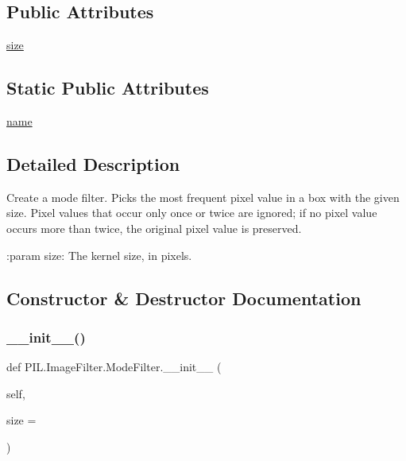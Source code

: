 \subsection*{Public Attributes}
\begin{DoxyCompactItemize}
\item 
\hyperlink{classPIL_1_1ImageFilter_1_1ModeFilter_a0464bb9aa5a0c5d3e17878ce56d687a1}{size}
\end{DoxyCompactItemize}
\subsection*{Static Public Attributes}
\begin{DoxyCompactItemize}
\item 
\hyperlink{classPIL_1_1ImageFilter_1_1ModeFilter_a1478a4e8ffde7c3cb2d5eb60dabb7633}{name}
\end{DoxyCompactItemize}


\subsection{Detailed Description}
\begin{DoxyVerb}Create a mode filter. Picks the most frequent pixel value in a box with the
given size.  Pixel values that occur only once or twice are ignored; if no
pixel value occurs more than twice, the original pixel value is preserved.

:param size: The kernel size, in pixels.
\end{DoxyVerb}
 

\subsection{Constructor \& Destructor Documentation}
\mbox{\label{classPIL_1_1ImageFilter_1_1ModeFilter_ac8790ad26d28c2e826f0cefa2b86bbb1}} 
\subsubsection{\texorpdfstring{\+\_\+\+\_\+init\+\_\+\+\_\+()}{\_\_init\_\_()}}
{\footnotesize\ttfamily def P\+I\+L.\+Image\+Filter.\+Mode\+Filter.\+\_\+\+\_\+init\+\_\+\+\_\+ (\begin{DoxyParamCaption}\item[{}]{self,  }\item[{}]{size = {} }\end{DoxyParamCaption})}



